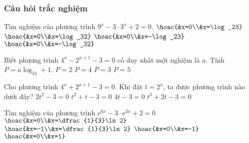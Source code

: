 \subsubsection{Câu hỏi trắc nghiệm}
\begin{ex}%
	Tìm nghiệm của phương trình $9^x-3\cdot 3^x+2=0$. 
	\choice
	{$\hoac{&x=0\\&x=\log_23}$}
	{\True $\hoac{&x=0\\&x=\log_32}$}
	{$\hoac{&x=0\\&x=-\log_23}$}
	{$\hoac{&x=0\\&x=-\log_32}$}
\end{ex}

\begin{ex}%
	Biết phương trình $4^x-2^{x+1}-3=0$ có duy nhất một nghiệm là $a$. Tính $P=a\log_34+1$. 
	\choice
	{$P=2$}
	{$P=4$}
	{\True $P=3$}
	{$P=5$}
\end{ex}

\begin{ex}%
	Cho phương trình $4^x+2^{x+1}-3=0$. Khi đặt $t=2^x$, ta được phương trình nào dưới đây?
	\choice
	{$2t^2-3=0$}
	{$t^2+t-3=0$}
	{$4t-3=0$}
	{\True $t^2+2t-3=0$}
\end{ex}

\begin{ex}%
	Tìm nghiệm của phương trình $\mathrm{e}^{6x}-3\cdot\mathrm{e}^{3x}+2=0$ 
	\choice
	{\True $\hoac{&x=0\\&x=\dfrac{1}{3}\ln 2}$}
	{$\hoac{&x=-1\\&x=\dfrac{1}{3}\ln 2}$}
	{$\hoac{&x=0\\&x=-1}$}
	{$\hoac{&x=0\\&x=1}$}
\end{ex}

